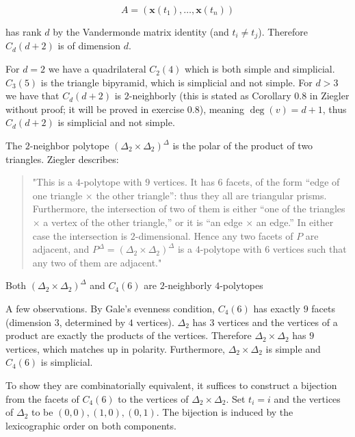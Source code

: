 \documentclass{article}
\begin{document}
\begin{enumerate}
\begin{solution}
\[A = (\textbf{x}(t_1), \ldots, \textbf{x}(t_n))\]

has rank $d$ by the Vandermonde matrix identity (and $t_i \neq t_j$). Therefore $C_d(d+2)$ is of dimension $d$. 
    
For $d=2$ we have a quadrilateral $C_2(4)$ which is both simple and simplicial. $C_3(5)$ is the triangle bipyramid, which is simplicial and not simple. For $d>3$ we have that $C_d(d+2)$ is $2$-neighborly (this is stated as Corollary 0.8 in Ziegler without proof; it will be proved in exercise 0.8), meaning $\deg(v) = d+1$, thus $C_d(d+2)$ is simplicial and not simple. 

\smallskip
The $2$-neighbor polytope $(\Delta_2 \times \Delta_2)^{\Delta}$ is the polar of the product of two triangles. Ziegler describes:
\begin{quote}
"This is a $4$-polytope with $9$ vertices. It has $6$ facets, of the form ``edge of one triangle $\times$ the other triangle'': thus they all are triangular prisms. Furthermore, the intersection of two of them is either ``one of the triangles $\times$ a vertex of the other triangle,'' or it is ``an edge $\times$ an edge.'' In either case the intersection is $2$-dimensional. Hence any two facets of $P$ are adjacent, and $P^{\Delta} = (\Delta_{2} \times \Delta_{2})^{\Delta}$ is a $4$-polytope with $6$ vertices such that any two of them are adjacent."
\end{quote}

Both $(\Delta_2 \times \Delta_2)^{\Delta}$ and $C_4(6)$ are  $2$-neighborly $4$-polytopes 

A few observations. By Gale's evenness condition, $C_4(6)$ has exactly $9$ facets (dimension $3$, determined by $4$ vertices). $\Delta_2$ has $3$ vertices and the vertices of a product are exactly the products of the vertices. Therefore $\Delta_2 \times \Delta_2$ has $9$ vertices, which matches up in polarity. Furthermore, $\Delta_2 \times \Delta_2$ is simple and $C_4(6)$ is simplicial. 

To show they are combinatorially equivalent, it suffices to construct a bijection from the facets of $C_4(6)$ to the vertices of $\Delta_2 \times \Delta_2$. Set $t_i = i$ and the vertices of $\Delta_2$ to be $(0,0), (1,0), (0,1)$. The bijection is induced by the lexicographic order on both components.


\end{solution}


\end{enumerate}
\end{document}

